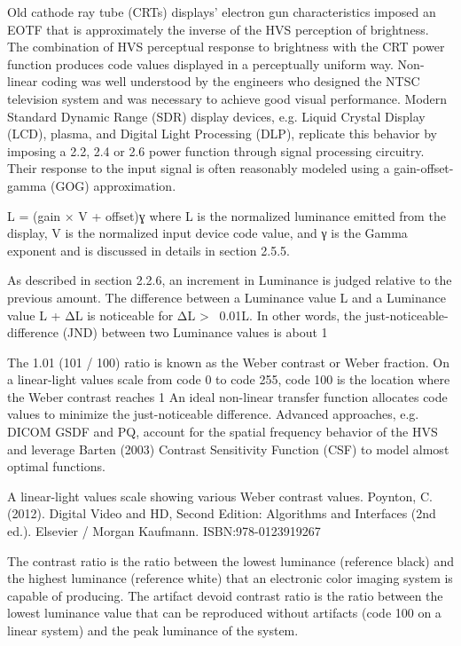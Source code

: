 Old cathode ray tube (CRTs) displays’ electron gun characteristics imposed an EOTF that is approximately the inverse of the HVS perception of brightness. The combination of HVS perceptual response to brightness with the CRT power function produces code values displayed in a perceptually uniform way. Non-linear coding was well understood by the engineers who designed the NTSC television system and was necessary to achieve good visual performance. Modern Standard Dynamic Range (SDR) display devices, e.g. Liquid Crystal Display (LCD), plasma, and Digital Light Processing (DLP), replicate this behavior by imposing a 2.2, 2.4 or 2.6 power function through signal processing circuitry. Their response to the input signal is often reasonably modeled using a gain-offset-gamma (GOG) approximation.

L = (gain × V + offset)ɣ
where L is the normalized luminance emitted from the display, V is the normalized input device code value, and γ is the Gamma exponent and is discussed in details in section 2.5.5.

As described in section 2.2.6, an increment in Luminance is judged relative to the previous amount. The difference between a Luminance value L and a Luminance value L + ΔL is noticeable for ΔL > ~0.01L. In other words, the just-noticeable-difference (JND) between two Luminance values is about 1%

The 1.01 (101 / 100) ratio is known as the Weber contrast or Weber fraction. On a linear-light values scale from code 0 to code 255, code 100 is the location where the Weber contrast reaches 1%
An ideal non-linear transfer function allocates code values to minimize the just-noticeable difference. Advanced approaches, e.g. DICOM GSDF and PQ, account for the spatial frequency behavior of the HVS and leverage Barten (2003) Contrast Sensitivity Function (CSF) to model almost optimal functions.

A linear-light values scale showing various Weber contrast values.
Poynton, C. (2012). Digital Video and HD, Second Edition: Algorithms and Interfaces (2nd ed.). Elsevier / Morgan Kaufmann. ISBN:978-0123919267


The contrast ratio is the ratio between the lowest luminance (reference black) and the highest luminance (reference white) that an electronic color imaging system is capable of producing. The artifact devoid contrast ratio is the ratio between the lowest luminance value that can be reproduced without artifacts (code 100 on a linear system) and the peak luminance of the system.

